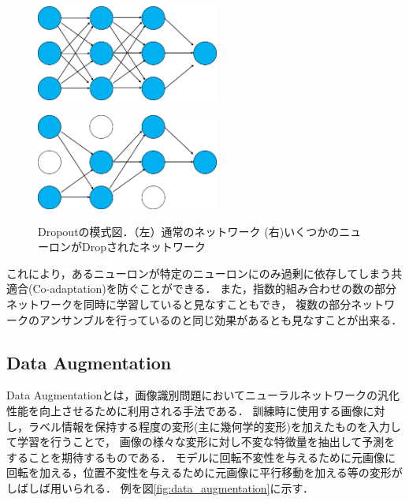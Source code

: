\begin{figure}[tbp]
    \begin{minipage}{0.5\hsize}
     \begin{center}
      \includegraphics[width=60mm]{figures/standard_network.png}
     \end{center}
     \label{fig:one}
    \end{minipage}
    \begin{minipage}{0.5\hsize}
     \begin{center}
      \includegraphics[width=60mm]{figures/dropout_network.png}
     \end{center}
     \label{fig:two}
    \end{minipage}
    \caption{\label{fig:dropout_network}Dropoutの模式図．（左）通常のネットワーク (右)いくつかのニューロンがDropされたネットワーク}
    
\end{figure}

これにより，あるニューロンが特定のニューロンにのみ過剰に依存してしまう共適合(Co-adaptation)を防ぐことができる．
また，指数的組み合わせの数の部分ネットワークを同時に学習していると見なすこともでき，
複数の部分ネットワークのアンサンブルを行っているのと同じ効果があるとも見なすことが出来る．

\subsection{\textbf{Data Augmentation}}

Data Augmentationとは，画像識別問題においてニューラルネットワークの汎化性能を向上させるために利用される手法である．
訓練時に使用する画像に対し，ラベル情報を保持する程度の変形(主に幾何学的変形)を加えたものを入力して学習を行うことで，
画像の様々な変形に対し不変な特徴量を抽出して予測をすることを期待するものである．
モデルに回転不変性を与えるために元画像に回転を加える，位置不変性を与えるために元画像に平行移動を加える等の変形がしばしば用いられる．
例を図\ref{fig:data_augmentation}に示す．

